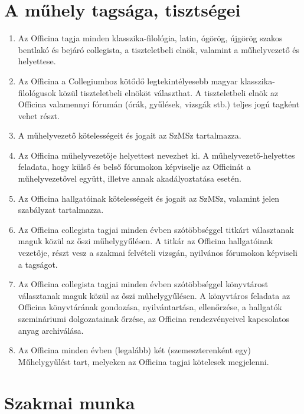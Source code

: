 \documentclass{../styles/rulebook}
\begin{document}
\section{A műhely tagsága, tisztségei}

\begin{enumerate}
	\item Az Officina tagja minden klasszika-filológia, latin, ógörög, újgörög szakos bentlakó és bejáró collegista, a tiszteletbeli elnök, valamint a műhelyvezető és helyettese.
	\item Az Officina a Collegiumhoz kötődő legtekintélyesebb magyar klasszika-filológusok közül tiszteletbeli elnököt választhat. A tiszteletbeli elnök az Officina valamennyi fórumán (órák, gyűlések, vizsgák stb.) teljes jogú tagként vehet részt.
	\item A műhelyvezető kötelességeit és jogait az SzMSz tartalmazza.
	\item Az Officina műhelyvezetője helyettest nevezhet ki. A műhelyvezető-helyettes feladata, hogy külső és belső fórumokon képviselje az Officinát a műhelyvezetővel együtt, illetve annak akadályoztatása esetén.
	\item Az Officina hallgatóinak kötelességeit és jogait az SzMSz, valamint jelen szabályzat tartalmazza. 
	\item Az Officina collegista tagjai minden évben szótöbbséggel titkárt választanak maguk közül az őszi műhelygyűlésen. A titkár az Officina hallgatóinak vezetője, részt vesz a szakmai felvételi vizsgán, nyilvános fórumokon képviseli a tagságot.
	\item Az Officina collegista tagjai minden évben szótöbbséggel könyvtárost választanak maguk közül az őszi műhelygyűlésen. A könyvtáros feladata az Officina könyvtárának gondozása, nyilvántartása, ellenőrzése, a hallgatók szemináriumi dolgozatainak őrzése, az Officina rendezvényeivel kapcsolatos anyag archiválása.
	\item Az Officina minden évben (legalább) két (szemeszterenként egy) Műhelygyűlést tart, melyeken az Officina tagjai kötelesek megjelenni.
\end{enumerate}


\section{Szakmai munka}
\end{document}
